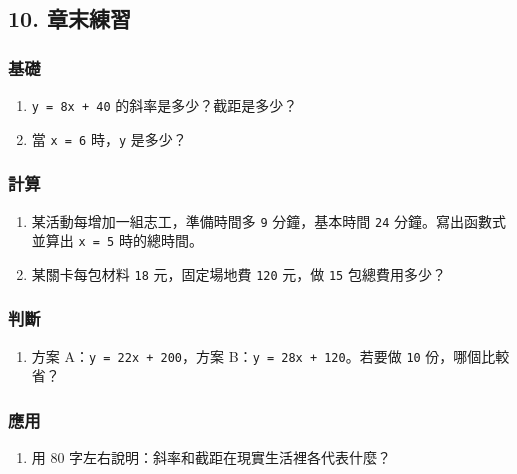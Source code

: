 \documentclass[
  chinese,
  12pt,
  a4paper,
  oneside]{article}
\providecommand{\tightlist}{%
  \setlength{\itemsep}{0pt}\setlength{\parskip}{0pt}}
\begin{document}
\subsection{10. 章末練習}\label{ux7ae0ux672bux7df4ux7fd2-1}

\subsubsection{基礎}\label{ux57faux790e-1}

\begin{enumerate}
\def\labelenumi{\arabic{enumi}.}
\tightlist
\item
  \texttt{y\ =\ 8x\ +\ 40} 的斜率是多少？截距是多少？
\item
  當 \texttt{x\ =\ 6} 時，\texttt{y} 是多少？
\end{enumerate}

\subsubsection{計算}\label{ux8a08ux7b97-1}

\begin{enumerate}
\def\labelenumi{\arabic{enumi}.}
\setcounter{enumi}{2}
\tightlist
\item
  某活動每增加一組志工，準備時間多 \texttt{9} 分鐘，基本時間 \texttt{24}
  分鐘。寫出函數式並算出 \texttt{x\ =\ 5} 時的總時間。
\item
  某關卡每包材料 \texttt{18} 元，固定場地費 \texttt{120} 元，做
  \texttt{15} 包總費用多少？
\end{enumerate}

\subsubsection{判斷}\label{ux5224ux65b7-1}

\begin{enumerate}
\def\labelenumi{\arabic{enumi}.}
\setcounter{enumi}{4}
\tightlist
\item
  方案 A：\texttt{y\ =\ 22x\ +\ 200}，方案
  B：\texttt{y\ =\ 28x\ +\ 120}。若要做 \texttt{10} 份，哪個比較省？
\end{enumerate}

\subsubsection{應用}\label{ux61c9ux7528-1}

\begin{enumerate}
\def\labelenumi{\arabic{enumi}.}
\setcounter{enumi}{5}
\tightlist
\item
  用 80 字左右說明：斜率和截距在現實生活裡各代表什麼？
\end{enumerate}
\end{document}
